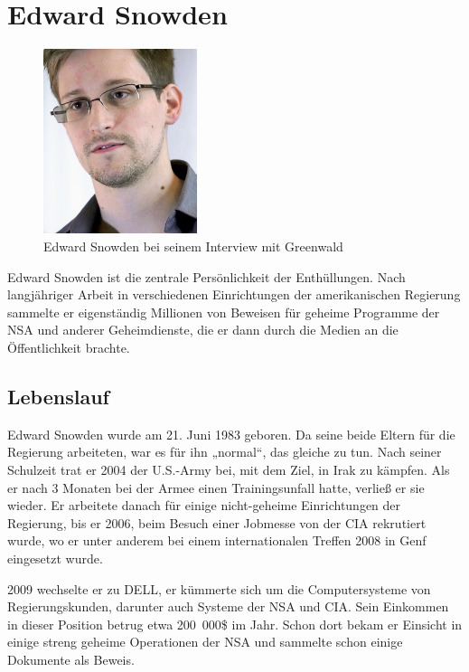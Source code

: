 \documentclass[12pt,a4paper]{scrartcl}
\begin{document}
\section{Edward Snowden}
\begin{figure}
\centering
\includegraphics[width=0.4\textwidth]{images/snowden.jpg}
\caption{Edward Snowden bei seinem Interview mit Greenwald \cite{commons_snowden}}
\end{figure}
Edward Snowden ist die zentrale Persönlichkeit der Enthüllungen. Nach langjähriger Arbeit in verschiedenen Einrichtungen der amerikanischen Regierung sammelte er eigenständig Millionen von Beweisen für geheime Programme der NSA und anderer Geheimdienste, die er dann durch die Medien an die Öffentlichkeit brachte.

\subsection{Lebenslauf}
Edward Snowden wurde am 21. Juni 1983 geboren.
Da seine beide Eltern für die Regierung arbeiteten, war es für ihn „normal“, das gleiche zu tun.\cite{wiki_snowden}
Nach seiner Schulzeit trat er 2004 der U.S.-Army bei, mit dem Ziel, in Irak zu kämpfen. Als er nach 3 Monaten bei der Armee einen Trainingsunfall hatte, verließ er sie wieder.\cite{wiki_snowden}
Er arbeitete danach für einige nicht-geheime Einrichtungen der Regierung, bis er 2006, beim Besuch einer Jobmesse von der CIA rekrutiert wurde, wo er unter anderem bei einem internationalen Treffen 2008 in Genf eingesetzt wurde.
\cite{wiki_snowden}

2009 wechselte er zu DELL, er kümmerte sich um die Computersysteme von Regierungskunden, darunter auch Systeme der NSA und CIA. Sein Einkommen in dieser Position betrug etwa 200~000\$ im Jahr.
Schon dort bekam er Einsicht in einige streng geheime Operationen der NSA und sammelte schon einige Dokumente als Beweis.\cite{wiki_snowden}
\end{document}
